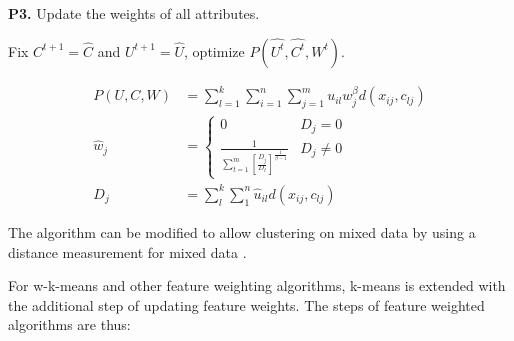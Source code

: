 \documentclass[../report.tex]{subfiles}
\begin{document}
\vspace{4mm}
\begin{description}
  \label{desc:P3}
\item \textbf{P3.} \quad Update the weights of all attributes.
    \begin{description}
      \item Fix $C^{t+1} = \hat{C}$ and $U^{t+1} = \hat{U}$, optimize $P(\hat{U^{t}}, \hat{ C^{t} }, W^{t})$.
    \end{description}
\end{description}
\vspace{4mm}

\begin{align}
  \label{eq:wk_c}
  P(U,C,W) &= \sum^k_{l=1} \sum^n_{i=1} \sum^m_{j=1} u_{il} w_j^{\beta} d(x_{ij},c_{lj}) \\
  \label{eq:wk_w}
  \hat{w}_j &=
  \begin{cases}
    0 & D_j = 0 \\
    \frac{1}{ \sum^m_{t=1} [\frac{ D_j }{ D_t }]^{ \frac{ 1 }{ \beta - 1 } } } & D_j \neq 0
  \end{cases} \\
  \label{eq:wk_d}
  D_j &= \sum^{ k }_{ l }{\sum^n_1 {\hat{u}_{il} d(x_{ ij }, c_ { lj } )}}
\end{align}

The algorithm can be modified to allow clustering on mixed data by using a distance measurement for mixed data \cite{Jia2018}.

For w-k-means and other feature weighting algorithms, k-means is extended with the additional step of updating feature weights. The steps of feature weighted algorithms are thus:
\end{document}
